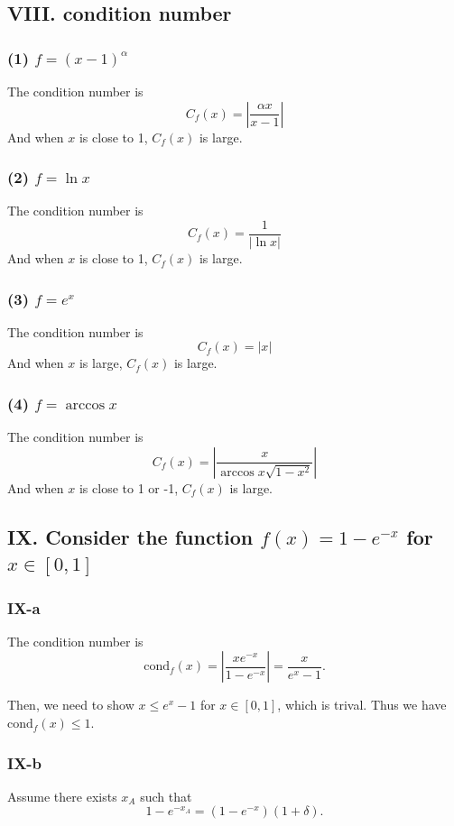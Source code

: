\documentclass[a4paper]{article}
\newcommand{\abs}[1]{\left|#1\right|}
\begin{document}
\subsection*{VIII. condition number}
\subsubsection*{(1) $f = (x-1)^\alpha$}
The condition number is
\[
  C_f(x) = \abs{\frac{\alpha x}{x-1}}
\]
And when $x$ is close to 1, $C_f(x)$ is large.

\subsubsection*{(2) $f = \ln x$}
The condition number is
\[
  C_f(x) = \frac{1}{\abs{\ln x}}
\]
And when $x$ is close to 1, $C_f(x)$ is large.

\subsubsection*{(3) $f = e^x$}
The condition number is
\[
  C_f(x) = \abs{x}
\]
And when $x$ is large, $C_f(x)$ is large.

\subsubsection*{(4) $f = \arccos {x}$}
The condition number is
\[
  C_f(x) = \abs{\frac{x}{\arccos {x}\sqrt{1-x^2}}}
\]
And when $x$ is close to 1 or -1, $C_f(x)$ is large.

\subsection*{IX. Consider the function $f(x) = 1-e^{-x}$ for $x\in [0,1]$}
\subsubsection*{IX-a}
The condition number is\[ 
\text{cond}_f(x) = \abs{\frac{xe^{-x}}{1-e^{-x}}} = \frac{x}{e^{x} - 1}.
\]

Then, we need to show $x \leq e^x - 1$ for $x \in [0,1]$, which is trival. Thus we have $\text{cond}_f(x) \leq 1$.

\subsubsection*{IX-b}
Assume there exists $x_A$ such that \[
1-e^{-x_A} = (1-e^{-x})(1+\delta).  \]
\end{document}
